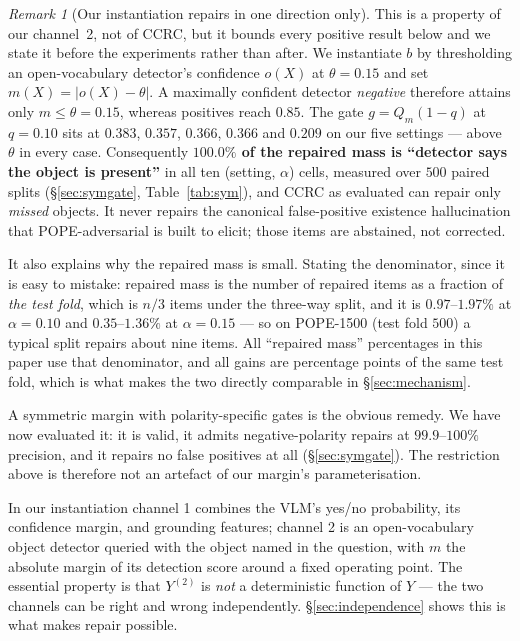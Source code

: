 \documentclass{article}
\theoremstyle{plain}
\theoremstyle{definition}
\theoremstyle{remark}
\newtheorem{remark}{Remark}
\begin{document}
\begin{remark}[Our instantiation repairs in one direction only]
\label{rem:onedir}
This is a property of our channel~2, not of CCRC, but it bounds every positive result below
and we state it before the experiments rather than after. We instantiate $b$ by thresholding
an open-vocabulary detector's confidence $o(X)$ at $\theta=0.15$ and set
$m(X)=|o(X)-\theta|$. A maximally confident detector \emph{negative} therefore attains only
$m\le\theta=0.15$, whereas positives reach $0.85$. The gate $g=Q_m(1-q)$ at $q=0.10$ sits at
$0.383$, $0.357$, $0.366$, $0.366$ and $0.209$ on our five settings --- above $\theta$ in every
case. Consequently \textbf{$100.0\%$ of the repaired mass is ``detector says the object is
present''} in all ten (setting, $\alpha$) cells, measured over $500$ paired splits
(\S\ref{sec:symgate}, Table~\ref{tab:sym}), and CCRC as evaluated can repair only \emph{missed}
objects. It never repairs the canonical false-positive existence hallucination that
POPE-adversarial is built to elicit; those items are abstained, not corrected.

It also explains why the repaired mass is small. Stating the denominator, since it is easy to
mistake: repaired mass is the number of repaired items as a fraction of \emph{the test fold},
which is $n/3$ items under the three-way split, and it is $0.97$--$1.97\%$ at $\alpha=0.10$ and
$0.35$--$1.36\%$ at $\alpha=0.15$ --- so on POPE-1500 (test fold $500$) a typical split repairs
about nine items. All ``repaired mass'' percentages in this paper use that denominator, and all
gains are percentage points of the same test fold, which is what makes the two directly
comparable in \S\ref{sec:mechanism}.

A symmetric margin with polarity-specific gates is the obvious remedy. We have now evaluated
it: it is valid, it admits negative-polarity repairs at $99.9$--$100\%$ precision, and it
repairs no false positives at all (\S\ref{sec:symgate}). The restriction above is therefore not
an artefact of our margin's parameterisation.
\end{remark}

In our instantiation channel 1 combines the VLM's yes/no probability, its confidence
margin, and grounding features; channel 2 is an open-vocabulary object detector
\citep{owlv2} queried with the object named in the question, with $m$ the absolute margin of
its detection score around a fixed operating point. The essential property is that
$Y^{(2)}$ is \emph{not} a deterministic function of $Y$ --- the two channels can be right
and wrong independently. \S\ref{sec:independence} shows this is what makes repair possible.
\end{document}
